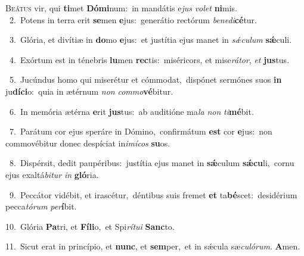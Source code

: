 \lettrine{\initial\textcolor{\initialcolor}{B}}{eátus} vir, qui \textbf{ti}\-met \textbf{Dó}\-\textbf{mi}num:~\star in mandátis e\textit{jus} \textit{vo}\-\textit{let} \textbf{ni}\-mis.\\
{\numbfont\textcolor{\numbcolor}{~2.}}~Potens in terra erit \textbf{se}\-men \textbf{e}\-jus:~\star generátio rectórum \textit{be}\-\textit{ne}\textit{di}\textbf{cé}tur.\par
{\numbfont\textcolor{\numbcolor}{~3.}}~Glória, et divítiæ in \textbf{do}\-mo \textbf{e}\-jus:~\star et justítia ejus manet in \textit{sǽ}\-\textit{cu}\textit{lum} \textbf{sǽ}\-culi.\par
{\numbfont\textcolor{\numbcolor}{~4.}}~Exórtum est in ténebris \textbf{lu}\-men \textbf{rec}\-tis:~\star miséricors, et mise\-\textit{rá}\-\textit{tor}, \textit{et} \textbf{jus}\-tus.\par
{\numbfont\textcolor{\numbcolor}{~5.}}~Jucúndus homo qui miserétur et cómmodat,~\dagger dispónet sermónes suos \textbf{in} ju\-\textbf{dí}\-\textbf{ci}o:~\star quia in ætérnum \textit{non} \textit{com}\-\textit{mo}\textbf{vé}bitur.\par
{\numbfont\textcolor{\numbcolor}{~6.}}~In memória ætérna \textbf{e}\-rit \textbf{jus}\-tus:~\star ab auditióne ma\textit{la} \textit{non} \textit{ti}\-\textbf{mé}bit.\par
{\numbfont\textcolor{\numbcolor}{~7.}}~Parátum cor ejus speráre in Dómino,~\dagger confirmátum \textbf{est} cor \textbf{e}\-jus:~\star non commovébitur donec despíciat in\-\textit{i}\-\textit{mí}\textit{cos} \textbf{su}\-os.\par
{\numbfont\textcolor{\numbcolor}{~8.}}~Dispérsit, dedit paupéribus:~\dagger justítia ejus manet in \textbf{sǽ}\-culum \textbf{sǽ}\-\textbf{cu}li,~\star cornu ejus exaltá\-\textit{bi}\-\textit{tur} \textit{in} \textbf{gló}\-ria.\par
{\numbfont\textcolor{\numbcolor}{~9.}}~Peccátor vidébit, et irascétur,~\dagger déntibus suis fremet \textbf{et} ta\-\textbf{bé}\-scet:~\star desidérium pecca\-\textit{tó}\-\textit{rum} \textit{per}\-\textbf{í}bit.\par
{\numbfont\textcolor{\numbcolor}{10.}}~Glória \textbf{Pa}\-tri, et \textbf{Fí}\-\textbf{li}o,~\star et Spi\-\textit{rí}\-\textit{tu}\textit{i} \textbf{Sanc}\-to.\par
{\numbfont\textcolor{\numbcolor}{11.}}~Sicut erat in princípio, et \textbf{nunc}\-, et \textbf{sem}\-per,~\star et in sǽcula sæ\-\textit{cu}\-\textit{ló}\textit{rum}. \textbf{A}\-men.\par
